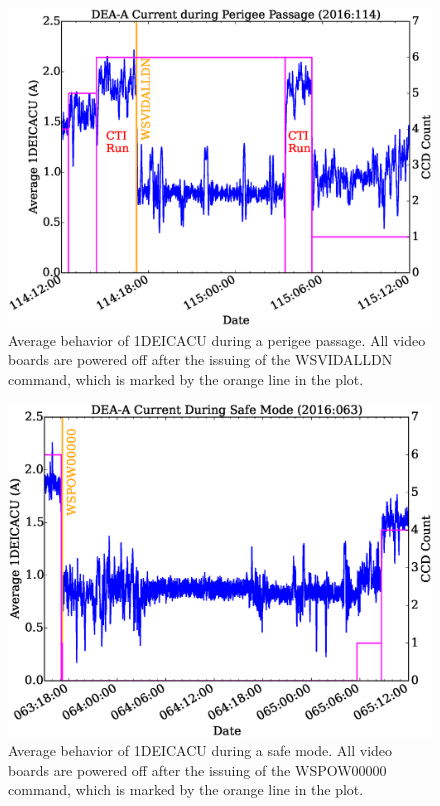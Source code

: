 \documentclass[11pt]{article}
\begin{document}
\begin{landscape}
\begin{figure}
\begin{center}
\includegraphics[width=1.2\textwidth]{deaa_on_test_vid_fig1.eps}
\caption{Average behavior of 1DEICACU during a perigee passage. All video boards
are powered off after the issuing of the WSVIDALLDN command, which is marked by
the orange line in the plot.}
\end{center}
\end{figure}
\end{landscape}

\begin{landscape}
\begin{figure}
\begin{center}
\includegraphics[width=1.2\textwidth]{deaa_on_test_vid_fig2.eps}
\caption{Average behavior of 1DEICACU during a safe mode. All video boards
are powered off after the issuing of the WSPOW00000 command, which is marked by
the orange line in the plot.}
\end{center}
\end{figure}
\end{landscape}
\end{document}
